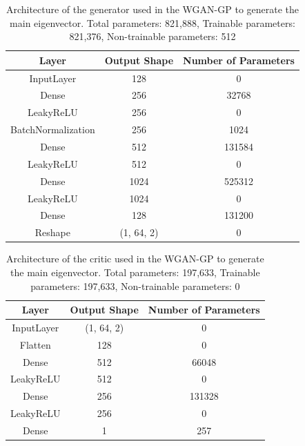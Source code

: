 \documentclass[11pt,a4paper,twoside]{report}
\begin{document}
\begin{table}[]
  \centering
  \begin{tabular}{c c c}
      \hline
      \textbf{Layer} & \textbf{Output Shape} & \textbf{Number of Parameters} \\ \hline
      InputLayer            & 128           & 0                 \\
      Dense                 & 256           & 32768             \\
      LeakyReLU             & 256           & 0                 \\
      BatchNormalization    & 256           & 1024              \\
      Dense                 & 512           & 131584            \\
      LeakyReLU             & 512           & 0                 \\
      Dense                 & 1024          & 525312            \\
      LeakyReLU             & 1024          & 0                 \\
      Dense                 & 128           & 131200            \\
      Reshape               & (1, 64, 2)    & 0                 \\
  \end{tabular}
  \caption{Architecture of the generator used in the WGAN-GP to generate the main eigenvector. Total parameters: 821,888, Trainable parameters: 821,376, Non-trainable parameters: 512}
  \label{tab:main_evec_generator_WGANGP_architecture}
\end{table}

\begin{table}[]
  \centering
  \begin{tabular}{c c c}
      \hline
      \textbf{Layer} & \textbf{Output Shape} & \textbf{Number of Parameters} \\ \hline
      InputLayer            & (1, 64, 2)    & 0                 \\
      Flatten               & 128           & 0                 \\
      Dense                 & 512           & 66048             \\
      LeakyReLU             & 512           & 0                 \\
      Dense                 & 256           & 131328            \\
      LeakyReLU             & 256           & 0                 \\
      Dense                 & 1             & 257               \\
  \end{tabular}
  \caption{Architecture of the critic used in the WGAN-GP to generate the main eigenvector. Total parameters: 197,633, Trainable parameters: 197,633, Non-trainable parameters: 0}
  \label{tab:main_evec_critic_WGANGP_architecture}
\end{table}
\end{document}
